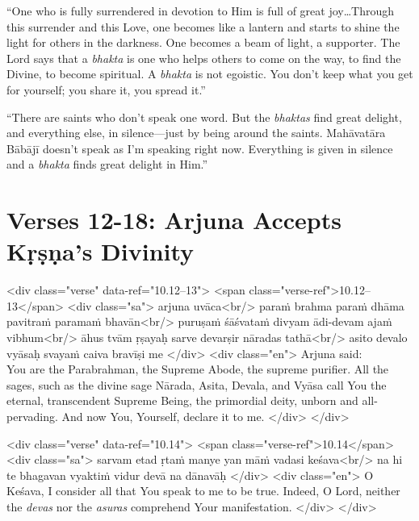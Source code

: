 \enquote{One who is fully surrendered in devotion to Him is full of great joy\ldots Through this surrender and this Love, one becomes like a lantern and starts to shine the light for others in the darkness. One becomes a beam of light, a supporter. The Lord says that a \textit{bhakta} is one who helps others to come on the way, to find the Divine, to become spiritual. A \textit{bhakta} is not egoistic. You don’t keep what you get for yourself; you share it, you spread it.}

\enquote{There are saints who don’t speak one word. But the \textit{bhaktas} find great delight, and everything else, in silence---just by being around the saints. Mahāvatāra Bābājī doesn’t speak as I’m speaking right now. Everything is given in silence and a \textit{bhakta} finds great delight in Him.}

\newpage
\section{Verses 12-18: Arjuna Accepts Kṛṣṇa's Divinity}\label{sec-verses-12-18-arjuna-accepts-krsna-s-divinity}


\begin{html}
<div class="verse" data-ref="10.12–13">
  <span class="verse-ref">10.12–13</span>
  <div class="sa">
    arjuna uvāca<br/>
    paraṁ brahma paraṁ dhāma pavitraṁ paramaṁ bhavān<br/>
    puruṣaṁ śāśvataṁ divyam ādi-devam ajaṁ vibhum<br/>
    āhus tvām ṛṣayaḥ sarve devarṣir nāradas tathā<br/>
    asito devalo vyāsaḥ svayaṁ caiva bravīṣi me
  </div>
  <div class="en">
    \hspace*{1em}Arjuna said: \\ You are the Parabrahman, the Supreme Abode, the supreme purifier. All the sages, such as the divine sage Nārada, Asita, Devala, and Vyāsa call You the eternal, transcendent Supreme Being, the primordial deity, unborn and all-pervading. And now You, Yourself, declare it to me.
  </div>
</div>
\end{html}



\begin{html}
<div class="verse" data-ref="10.14">
  <span class="verse-ref">10.14</span>
  <div class="sa">
    sarvam etad ṛtaṁ manye yan māṁ vadasi keśava<br/>
    na hi te bhagavan vyaktiṁ vidur devā na dānavāḥ
  </div>
  <div class="en">
    O Keśava, I consider all that You speak to me to be true. Indeed, O Lord, neither the \textit{devas} nor the \textit{asuras} comprehend Your manifestation.
  </div>
</div>
\end{html}



